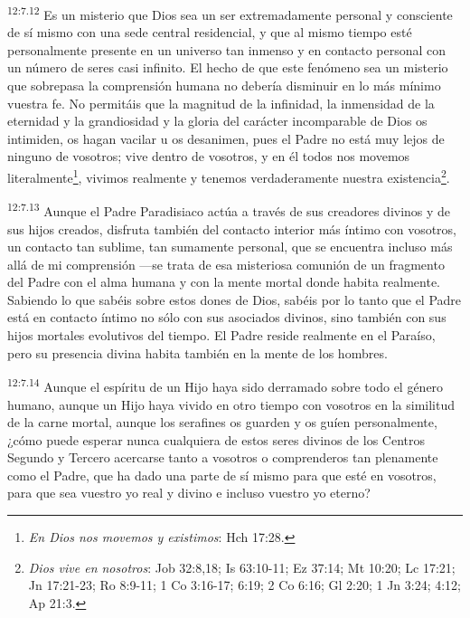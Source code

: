 \par
\textsuperscript{12:7.12} Es un misterio que Dios sea un ser extremadamente personal y consciente de sí mismo con una sede central residencial, y que al mismo tiempo esté personalmente presente en un universo tan inmenso y en contacto personal con un número de seres casi infinito. El hecho de que este fenómeno sea un misterio que sobrepasa la comprensión humana no debería disminuir en lo más mínimo vuestra fe. No permitáis que la magnitud de la infinidad, la inmensidad de la eternidad y la grandiosidad y la gloria del carácter incomparable de Dios os intimiden, os hagan vacilar u os desanimen, pues el Padre no está muy lejos de ninguno de vosotros; vive dentro de vosotros, y en él todos nos movemos literalmente\footnote{\textit{En Dios nos movemos y existimos}: Hch 17:28.}, vivimos realmente y tenemos verdaderamente nuestra existencia\footnote{\textit{Dios vive en nosotros}: Job 32:8,18; Is 63:10-11; Ez 37:14; Mt 10:20; Lc 17:21; Jn 17:21-23; Ro 8:9-11; 1 Co 3:16-17; 6:19; 2 Co 6:16; Gl 2:20; 1 Jn 3:24; 4:12; Ap 21:3.}.

\par
\textsuperscript{12:7.13} Aunque el Padre Paradisiaco actúa a través de sus creadores divinos y de sus hijos creados, disfruta también del contacto interior más íntimo con vosotros, un contacto tan sublime, tan sumamente personal, que se encuentra incluso más allá de mi comprensión ---se trata de esa misteriosa comunión de un fragmento del Padre con el alma humana y con la mente mortal donde habita realmente. Sabiendo lo que sabéis sobre estos dones de Dios, sabéis por lo tanto que el Padre está en contacto íntimo no sólo con sus asociados divinos, sino también con sus hijos mortales evolutivos del tiempo. El Padre reside realmente en el Paraíso, pero su presencia divina habita también en la mente de los hombres.

\par
\textsuperscript{12:7.14} Aunque el espíritu de un Hijo haya sido derramado sobre todo el género humano, aunque un Hijo haya vivido en otro tiempo con vosotros en la similitud de la carne mortal, aunque los serafines os guarden y os guíen personalmente, ¿cómo puede esperar nunca cualquiera de estos seres divinos de los Centros Segundo y Tercero acercarse tanto a vosotros o comprenderos tan plenamente como el Padre, que ha dado una parte de sí mismo para que esté en vosotros, para que sea vuestro yo real y divino e incluso vuestro yo eterno?

